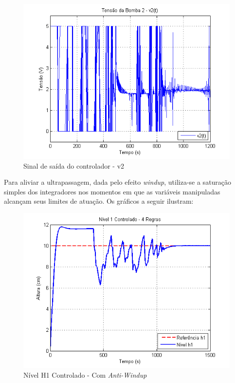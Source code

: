 \begin{figure}[H]
	\centering
	\includegraphics[height=0.35\paperheight, keepaspectratio]{img/nm_u2_ulim.png}
	\caption{Sinal de saída do controlador - v2 }
	\label{figNm_u2_ulim}
\end{figure}

Para aliviar a ultrapassagem, dada pelo efeito \textit{windup}, utiliza-se a saturação simples dos integradores nos momentos em que as variáveis manipuladas alcançam seus limites de atuação. Os gráficos a seguir ilustram:
\begin{figure}[H]
	\centering
	\includegraphics[height=0.35\paperheight, keepaspectratio]{img/nm_ctrl_h1ts2.png}
	\caption{\small Nível H1 Controlado - Com \textit{Anti-Windup}}
	\label{figH1TSCtrl2_nm}
\end{figure}


